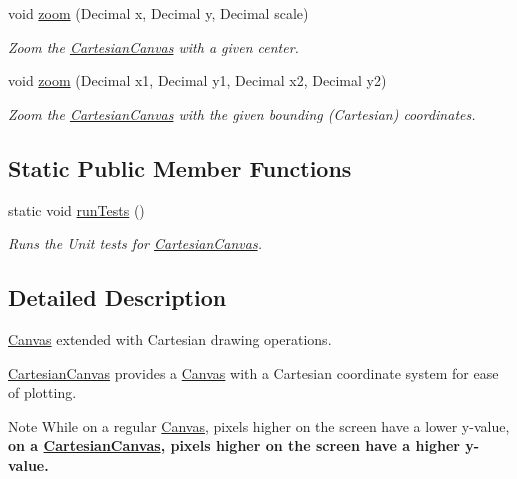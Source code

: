 \begin{DoxyCompactItemize}
void \hyperlink{classtsgl_1_1_cartesian_canvas_a69a378f61868c4c880889c33ec33c992}{zoom} (\-Decimal x, \-Decimal y, \-Decimal scale)
\begin{DoxyCompactList}\small\item\em \-Zoom the \hyperlink{classtsgl_1_1_cartesian_canvas}{\-Cartesian\-Canvas} with a given center. \end{DoxyCompactList}\item 
void \hyperlink{classtsgl_1_1_cartesian_canvas_adb1e999087c0ec7e4405d8ebd3ca9760}{zoom} (\-Decimal x1, \-Decimal y1, \-Decimal x2, \-Decimal y2)
\begin{DoxyCompactList}\small\item\em \-Zoom the \hyperlink{classtsgl_1_1_cartesian_canvas}{\-Cartesian\-Canvas} with the given bounding (\-Cartesian) coordinates. \end{DoxyCompactList}\end{DoxyCompactItemize}
\subsection*{\-Static \-Public \-Member \-Functions}
\begin{DoxyCompactItemize}
\item 
\hypertarget{classtsgl_1_1_cartesian_canvas_ae40d704629167ff70303a3c55ee3bb43}{static void \hyperlink{classtsgl_1_1_cartesian_canvas_ae40d704629167ff70303a3c55ee3bb43}{run\-Tests} ()}\label{classtsgl_1_1_cartesian_canvas_ae40d704629167ff70303a3c55ee3bb43}

\begin{DoxyCompactList}\small\item\em \-Runs the \-Unit tests for \hyperlink{classtsgl_1_1_cartesian_canvas}{\-Cartesian\-Canvas}. \end{DoxyCompactList}\end{DoxyCompactItemize}


\subsection{\-Detailed \-Description}
\hyperlink{classtsgl_1_1_canvas}{\-Canvas} extended with \-Cartesian drawing operations. 

\hyperlink{classtsgl_1_1_cartesian_canvas}{\-Cartesian\-Canvas} provides a \hyperlink{classtsgl_1_1_canvas}{\-Canvas} with a \-Cartesian coordinate system for ease of plotting. \begin{DoxyNote}{\-Note}
\-While on a regular \hyperlink{classtsgl_1_1_canvas}{\-Canvas}, pixels higher on the screen have a lower y-\/value, {\bfseries on a \hyperlink{classtsgl_1_1_cartesian_canvas}{\-Cartesian\-Canvas}, pixels higher on the screen have a higher y-\/value.} 
\end{DoxyNote}


